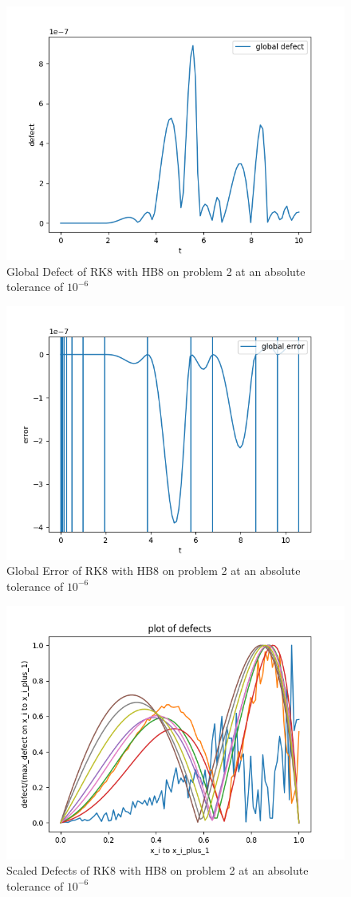 \documentclass{article}
\begin{document}
\begin{figure}[H]
\centering
\includegraphics[width=0.7\linewidth]{./figures/rk8_with_hb8_p2_global_defect}
\caption{Global Defect of RK8 with HB8 on problem 2 at an absolute tolerance of $10^{-6}$}
\label{fig:rk8_with_hb8_p2_global_defect}
\end{figure}

\begin{figure}[H]
\centering
\includegraphics[width=0.7\linewidth]{./figures/rk8_with_hb8_p2_global_error}
\caption{Global Error of RK8 with HB8 on problem 2 at an absolute tolerance of $10^{-6}$}
\label{fig:rk8_with_hb8_p2_global_error}
\end{figure}

\begin{figure}[H]
\centering
\includegraphics[width=0.7\linewidth]{./figures/rk8_with_hb8_p2_scaled_defects}
\caption{Scaled Defects of RK8 with HB8 on problem 2 at an absolute tolerance of $10^{-6}$}
\label{fig:rk8_with_hb8_p2_scaled_defects}
\end{figure}
\end{document}
